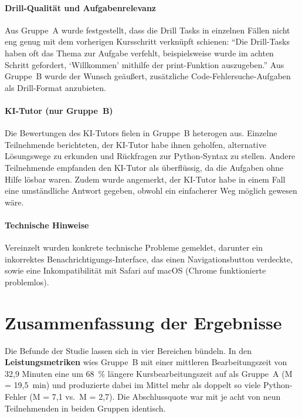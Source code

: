 \paragraph{Drill-Qualität und Aufgabenrelevanz}

Aus Gruppe~A wurde festgestellt, dass die Drill Tasks in einzelnen Fällen nicht eng genug mit dem vorherigen Kursschritt verknüpft schienen: \enquote{Die Drill-Tasks haben oft das Thema zur Aufgabe verfehlt, beispielsweise wurde im achten Schritt gefordert, `Willkommen' mithilfe der print-Funktion auszugeben.} Aus Gruppe~B wurde der Wunsch geäußert, zusätzliche Code-Fehlersuche-Aufgaben als Drill-Format anzubieten.

\clearpage
\paragraph{KI-Tutor (nur Gruppe~B)}

Die Bewertungen des KI-Tutors fielen in Gruppe~B heterogen aus. Einzelne Teilnehmende berichteten, der KI-Tutor habe ihnen geholfen, alternative Lösungswege zu erkunden und Rückfragen zur Python-Syntax zu stellen. Andere Teilnehmende empfanden den KI-Tutor als überflüssig, da die Aufgaben ohne Hilfe lösbar waren. Zudem wurde angemerkt, der KI-Tutor habe in einem Fall eine umständliche Antwort gegeben, obwohl ein einfacherer Weg möglich gewesen wäre.

\paragraph{Technische Hinweise}

Vereinzelt wurden konkrete technische Probleme gemeldet, darunter ein inkorrektes Benachrichtigungs-Interface, das einen Navigationsbutton verdeckte, sowie eine Inkompatibilität mit Safari auf macOS (Chrome funktionierte problemlos).

\section{Zusammenfassung der Ergebnisse}\label{sec:ergebnisse_zusammenfassung}

Die Befunde der Studie lassen sich in vier Bereichen bündeln. In den \textbf{Leistungsmetriken} wies Gruppe~B mit einer mittleren Bearbeitungszeit von 32{,}9 Minuten eine um 68~\% längere Kursbearbeitungszeit auf als Gruppe~A (M = 19{,}5~min) und produzierte dabei im Mittel mehr als doppelt so viele Python-Fehler (M = 7{,}1 vs.\ M = 2{,}7). Die Abschlussquote war mit je acht von neun Teilnehmenden in beiden Gruppen identisch.

